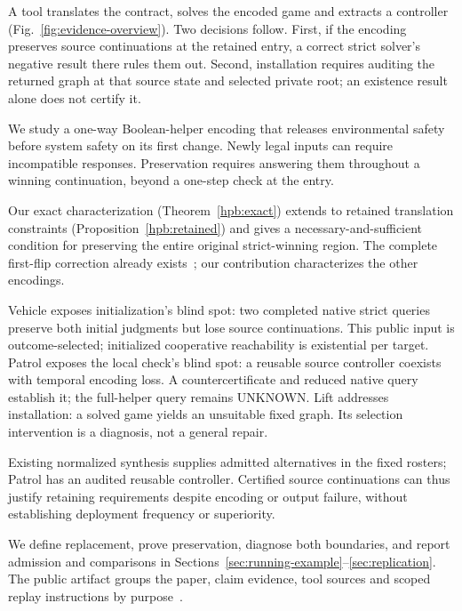 \documentclass[conference,10pt]{IEEEtran}
\begin{document}
A tool translates the contract, solves the encoded game and extracts a
controller (Fig.~\ref{fig:evidence-overview}). Two decisions follow.
First, if the encoding preserves source continuations at the retained
entry, a correct strict solver's negative result there rules them out.
Second, installation requires auditing the returned graph at that source
state and selected private root; an existence result alone does not
certify it.



We study a one-way Boolean-helper encoding that releases environmental
safety before system safety on its first change. Newly legal inputs can
require incompatible responses. Preservation requires answering them
throughout a winning continuation, beyond a one-step check at the entry.

Our exact characterization (Theorem~\ref{hpb:exact}) extends to retained
translation constraints (Proposition~\ref{hpb:retained}) and gives a
necessary-and-sufficient condition for preserving the entire original
strict-winning region. The complete first-flip correction already
exists~\cite{spectrarelease2024}; our contribution characterizes the
other encodings.

Vehicle exposes initialization's blind spot: two completed native strict
queries preserve both initial judgments but lose source continuations.
This public input is outcome-selected; initialized cooperative
reachability is existential per target. Patrol exposes the local check's
blind spot: a reusable source controller coexists with temporal encoding
loss. A countercertificate and reduced native query establish it; the
full-helper query remains UNKNOWN. Lift addresses installation: a solved
game yields an unsuitable fixed graph. Its selection intervention is a
diagnosis, not a general repair.

Existing normalized synthesis supplies admitted alternatives in the fixed
rosters; Patrol has an audited reusable controller. Certified source
continuations can thus justify retaining requirements despite encoding
or output failure, without establishing deployment frequency or superiority.

We define replacement, prove preservation, diagnose both boundaries, and
report admission and comparisons in Sections~\ref{sec:running-example}--\ref{sec:replication}.
The public artifact groups the paper, claim evidence, tool sources and
scoped replay instructions by purpose~\cite{artifactrepository}.
\end{document}
